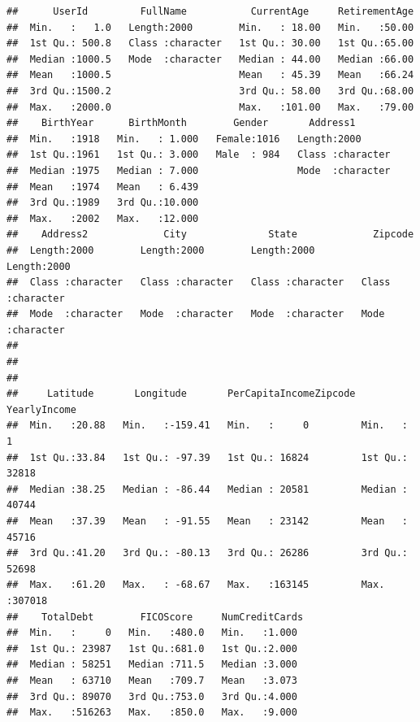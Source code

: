 \documentclass[
]{article}
\begin{document}
\begin{verbatim}
##      UserId         FullName           CurrentAge     RetirementAge  
##  Min.   :   1.0   Length:2000        Min.   : 18.00   Min.   :50.00  
##  1st Qu.: 500.8   Class :character   1st Qu.: 30.00   1st Qu.:65.00  
##  Median :1000.5   Mode  :character   Median : 44.00   Median :66.00  
##  Mean   :1000.5                      Mean   : 45.39   Mean   :66.24  
##  3rd Qu.:1500.2                      3rd Qu.: 58.00   3rd Qu.:68.00  
##  Max.   :2000.0                      Max.   :101.00   Max.   :79.00  
##    BirthYear      BirthMonth        Gender       Address1        
##  Min.   :1918   Min.   : 1.000   Female:1016   Length:2000       
##  1st Qu.:1961   1st Qu.: 3.000   Male  : 984   Class :character  
##  Median :1975   Median : 7.000                 Mode  :character  
##  Mean   :1974   Mean   : 6.439                                   
##  3rd Qu.:1989   3rd Qu.:10.000                                   
##  Max.   :2002   Max.   :12.000                                   
##    Address2             City              State             Zipcode         
##  Length:2000        Length:2000        Length:2000        Length:2000       
##  Class :character   Class :character   Class :character   Class :character  
##  Mode  :character   Mode  :character   Mode  :character   Mode  :character  
##                                                                             
##                                                                             
##                                                                             
##     Latitude       Longitude       PerCapitaIncomeZipcode  YearlyIncome   
##  Min.   :20.88   Min.   :-159.41   Min.   :     0         Min.   :     1  
##  1st Qu.:33.84   1st Qu.: -97.39   1st Qu.: 16824         1st Qu.: 32818  
##  Median :38.25   Median : -86.44   Median : 20581         Median : 40744  
##  Mean   :37.39   Mean   : -91.55   Mean   : 23142         Mean   : 45716  
##  3rd Qu.:41.20   3rd Qu.: -80.13   3rd Qu.: 26286         3rd Qu.: 52698  
##  Max.   :61.20   Max.   : -68.67   Max.   :163145         Max.   :307018  
##    TotalDebt        FICOScore     NumCreditCards 
##  Min.   :     0   Min.   :480.0   Min.   :1.000  
##  1st Qu.: 23987   1st Qu.:681.0   1st Qu.:2.000  
##  Median : 58251   Median :711.5   Median :3.000  
##  Mean   : 63710   Mean   :709.7   Mean   :3.073  
##  3rd Qu.: 89070   3rd Qu.:753.0   3rd Qu.:4.000  
##  Max.   :516263   Max.   :850.0   Max.   :9.000
\end{verbatim}
\end{document}
